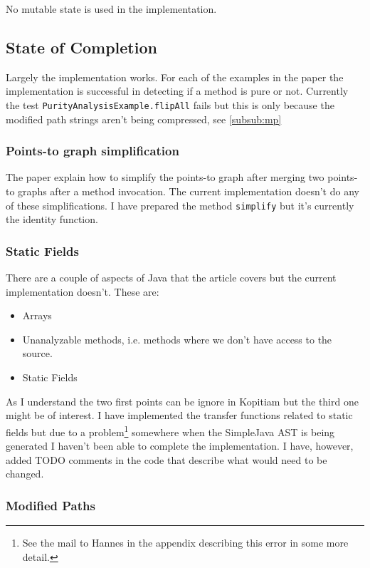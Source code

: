 \documentclass[11pt]{exam}
\begin{document}
No mutable state is used in the implementation.

\subsection{State of Completion}

Largely the implementation works. For each of the examples in the
paper the implementation is successful in detecting if a method is
pure or not. Currently the test \texttt{PurityAnalysisExample.flipAll}
fails but this is only because the modified path strings aren't being
compressed, see \ref{subsub:mp}

\subsubsection*{Points-to graph simplification}

The paper explain how to simplify the points-to graph after merging
two points-to graphs after a method invocation. The current
implementation doesn't do any of these simplifications. I have
prepared the method \texttt{simplify} but it's currently the identity
function.

\subsubsection*{Static Fields}

There are a couple of aspects of Java that the article covers but the
current implementation doesn't. These are:

\begin{itemize}
  \setlength{\itemsep}{1pt}
  \setlength{\parskip}{0pt}
  \item Arrays
  \item Unanalyzable methods, i.e. methods where we don't have access to the source.
  \item Static Fields
\end{itemize}

As I understand the two first points can be ignore in Kopitiam but the
third one might be of interest. I have implemented the transfer
functions related to static fields but due to a problem\footnote{See
the mail to Hannes in the appendix describing this error in some more
detail.} somewhere when the SimpleJava AST is being generated I
haven't been able to complete the implementation. I have, however,
added TODO comments in the code that describe what would need to be
changed.

\subsubsection*{Modified Paths}
\label{subsub:mp}
\end{document}
